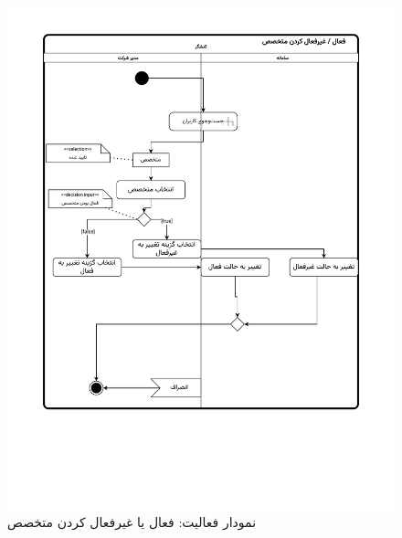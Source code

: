 \begin{figure}[ht!]
	\centering
	\includegraphics[scale=0.8, page=1]{figs/OOD-activity-activedeactive.pdf}
	\caption{نمودار فعالیت: فعال یا غیرفعال کردن متخصص}
\end{figure}
\FloatBarrier
\newpage

